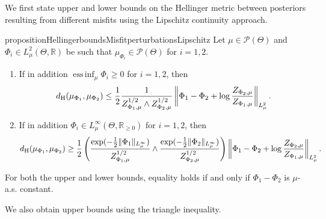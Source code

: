 \documentclass[a4paper]{scrartcl}
\theoremstyle{definition}
\numberwithin{equation}{section}
\newcommand{\R}{\mathbb{R}}
\DeclareMathOperator*{\essinf}{ess\,inf}
\newcommand{\norm}[1]{\Vert #1 \Vert}
\newcommand{\Norm}[1]{\left\Vert #1 \right\Vert}
\newcommand{\Hel}[0]{\textup{H}}
\begin{document}
We first state upper and lower bounds on the Hellinger metric between posteriors resulting from different misfits using the Lipschitz continuity approach. 
\begin{restatable}{proposition}{HellingerboundsMisfitperturbationsLipschitz}
 \label{proposition_Hellinger_bounds_misfit_perturbations_via_Lipschitz_continuity}
 Let $\mu\in\mathcal{P}(\Theta)$ and $\Phi_i\in L^2_\mu(\Theta,\R)$ be such that $\mu_{\Phi_i}\in\mathcal{P}(\Theta)$ for $i=1,2$. 
 \begin{enumerate}
  \item \label{proposition_Hellinger_bounds_misfit_perturbations_via_Lipschitz_continuity_upper_bound}
  If in addition $\essinf_\mu\Phi_i\geq 0$ for $i=1,2$, then
  \begin{equation*}
  d_{\Hel}(\mu_{\Phi_1},\mu_{\Phi_2})\leq \frac{1}{2}\frac{1}{Z_{\Phi_1,\mu}^{1/2} \wedge Z_{\Phi_2,\mu}^{1/2}}\Norm{\Phi_1-\Phi_2+\log \frac{Z_{\Phi_2,\mu}}{Z_{\Phi_1,\mu}}}_{L^2_\mu}.
 \end{equation*}
 
  \item 
  \label{proposition_Hellinger_bounds_misfit_perturbations_via_Lipschitz_continuity_lower_bound}
  If in addition $\Phi_i\in L^\infty_\mu(\Theta,\R_{\geq 0})$ for $i=1,2$, then
  \begin{equation*}
  d_{\Hel}(\mu_{\Phi_1},\mu_{\Phi_2})\geq \frac{1}{2}\left(\frac{\exp(-\tfrac{1}{2}\norm{\Phi_1}_{L^\infty_\mu})}{Z_{\Phi_1,\mu}^{1/2}}\wedge \frac{\exp(-\tfrac{1}{2}\norm{\Phi_2}_{L^\infty_\mu})}{Z_{\Phi_2,\mu}^{1/2}}\right)\Norm{\Phi_1-\Phi_2+\log \frac{Z_{\Phi_2,\mu}}{Z_{\Phi_1,\mu}}}_{L^2_\mu}.
 \end{equation*}
 \end{enumerate}
 For both the upper and lower bounds, equality holds if and only if $\Phi_1-\Phi_2$ is $\mu$-a.s. constant.
\end{restatable}
We also obtain upper bounds using the triangle inequality.
\end{document}
